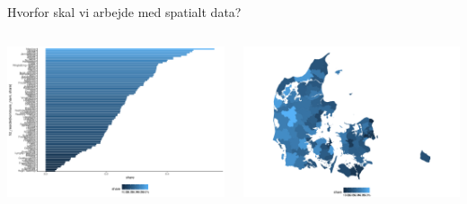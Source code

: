 \documentclass[
  8pt,
  ignorenonframetext,
  aspectratio=169]{beamer}
\newcommand{\columnsbegin}{\begin{columns}}
\newcommand{\columnsend}{\end{columns}}
\begin{document}
\begin{frame}{Hvorfor skal vi arbejde med spatialt data?}
\protect\hypertarget{hvorfor-skal-vi-arbejde-med-spatialt-data}{}
\columnsbegin
{}

\tiny

\includegraphics[width=1\linewidth]{crashcourse_slides_files/figure-beamer/unnamed-chunk-5-1}

\normalsize


\tiny

\includegraphics[width=1\linewidth]{crashcourse_slides_files/figure-beamer/unnamed-chunk-6-1}

\normalsize

\columnsend
\end{frame}
\end{document}
